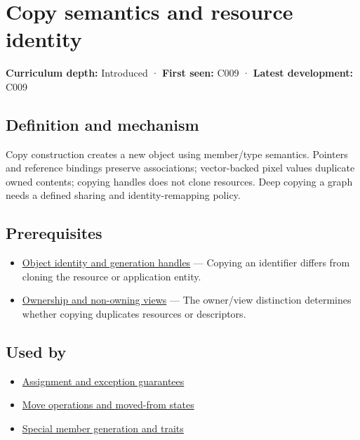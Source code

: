 \hypertarget{appendix-1340cd1ce582}{}\label{referencestart:appendix-1340cd1ce582}
\section{Copy semantics and resource identity}\label{appendix-1340cd1ce582-copy-semantics-and-resource-identity}

\textbf{Curriculum depth:} Introduced · \textbf{First seen:} C009 · \textbf{Latest development:} C009

\subsection{Definition and mechanism}\label{appendix-1340cd1ce582-definition-and-mechanism}

Copy construction creates a new object using member/type semantics. Pointers and reference bindings preserve associations; vector-backed pixel values duplicate owned contents; copying handles does not clone resources. Deep copying a graph needs a defined sharing and identity-remapping policy.

\subsection{Prerequisites}\label{appendix-1340cd1ce582-prerequisites}

\begin{itemize}
\tightlist
\item
  \hyperref[appendix-f1581457d322]{Object identity and generation handles} --- Copying an identifier differs from cloning the resource or application entity.
\item
  \hyperref[appendix-d52e4486f527]{Ownership and non-owning views} --- The owner/view distinction determines whether copying duplicates resources or descriptors.
\end{itemize}

\subsection{Used by}\label{appendix-1340cd1ce582-used-by}

\begin{itemize}
\tightlist
\item
  \hyperref[appendix-bea6beb5350f]{Assignment and exception guarantees}
\item
  \hyperref[appendix-5636651017c2]{Move operations and moved-from states}
\item
  \hyperref[appendix-42e02a12c694]{Special member generation and traits}
\end{itemize}

